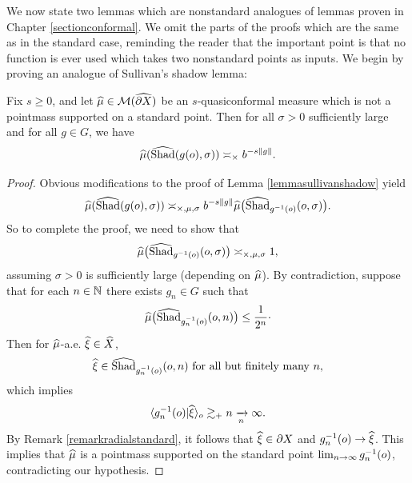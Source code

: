 We now state two lemmas which are nonstandard analogues of lemmas proven in Chapter \ref{sectionconformal}. We omit the parts of the proofs which are the same as in the standard case, reminding the reader that the important point is that no function is ever used which takes two nonstandard points as inputs. We begin by proving an analogue of Sullivan's shadow lemma:

\begin{lemma}
\label{lemmasullivanshadownonstandard}
Fix $s\geq 0$, and let $\widehat\mu\in\mathcal M(\widehat{\partial X})$ be an $s$-quasiconformal measure which is not a pointmass supported on a standard point. Then for all $\sigma > 0$ sufficiently large and for all $g\in G$, we have
\[
\widehat\mu(\widehat{\operatorname{Shad}}(g(o),\sigma)) \asymp_\times b^{-s\|g\|}.
\]
\end{lemma}
\begin{proof}
Obvious modifications to the proof of Lemma \ref{lemmasullivanshadow} yield
\[
\widehat\mu(\widehat{\operatorname{Shad}}(g(o),\sigma)) \asymp_{\times,\mu,\sigma} b^{-s\|g\|}\widehat\mu\big(\widehat{\operatorname{Shad}}_{g^{-1}(o)}(o,\sigma)\big).
\]
So to complete the proof, we need to show that
\[
\widehat\mu\big(\widehat{\operatorname{Shad}}_{g^{-1}(o)}(o,\sigma)\big) \asymp_{\times,\mu,\sigma} 1,
\]
assuming $\sigma > 0$ is sufficiently large (depending on $\widehat\mu$). By contradiction, suppose that for each $n\in\N$ there exists $g_n\in G$ such that
\[
\widehat\mu\big(\widehat{\operatorname{Shad}}_{g_n^{-1}(o)}(o,n)\big) \leq \frac{1}{2^n}\cdot
\]
Then for $\widehat\mu$-a.e. $\xihat\in\what X$,
\[
\xihat\in \what\Shad_{g_n^{-1}(\zero)}(\zero,n) \text{ for all but finitely many $n$},
\]
which implies
\[
\lb g_n^{-1}(\zero)|\xihat\rb_\zero \gtrsim_\plus n \tendsto n \infty.
\]
By Remark \ref{remarkradialstandard}, it follows that $\xihat\in\del X$ and $g_n^{-1}(\zero) \to \xihat$. This implies that $\widehat\mu$ is a pointmass supported on the standard point $\lim_{n\to\infty} g_n^{-1}(o)$, contradicting our hypothesis.
\end{proof}

